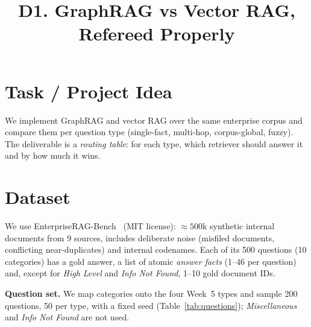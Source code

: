 \documentclass[conference]{IEEEtran}
\begin{document}
\title{D1. GraphRAG vs Vector RAG, Refereed Properly}

\author{
\and
{}
\and
{}
}

\maketitle

\section{Task / Project Idea}
We implement GraphRAG and vector RAG over the same enterprise corpus and compare them per question type (single-fact, multi-hop, corpus-global, fuzzy). The deliverable is a \emph{routing table}: for each type, which retriever should answer it and by how much it wins.

\section{Dataset}
We use EnterpriseRAG-Bench~\cite{b1} (MIT license): ${\approx}500$k synthetic internal documents from 9 sources, includes deliberate noise (misfiled documents, conflicting near-duplicates) and internal codenames. Each of its 500 questions (10 categories) has a gold answer, a list of atomic \emph{answer facts} (1--46 per question) and, except for \emph{High Level} and \emph{Info Not Found}, 1--10 gold document IDs.

\textbf{Question set.} We map categories onto the four Week~5 types and sample 200 questions, 50 per type, with a fixed seed (Table~\ref{tab:questions}); \emph{Miscellaneous} and \emph{Info Not Found} are not used.
\end{document}
